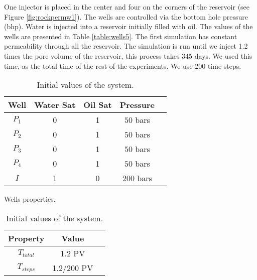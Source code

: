 \documentclass[12pt]{article}
\begin{document}
One injector is placed in the center and four on the corners of the reservoir (see Figure \ref{fig:rockpermw1}). The wells are controlled via the bottom hole pressure (bhp). 
 Water is injected into a reservoir initially filled with oil. The values of the wells are presented in Table \ref{table:wells5}. The first simulation has constant permeability through all the reservoir. The simulation is run until we inject 1.2 times the pore volume of the reservoir, this process takes 345 days. We used this time, as the total time of the rest of the experiments. We use 200 time steps.    
\begin{table}[!ht]
\hspace{-0cm}
\begin{minipage}{.5\textwidth}
\centering
\begin{tabular}{ |c|c|c|c|c|} 
\hline
Well&Water Sat&Oil Sat&Pressure\\
\hline
$P_1$&     0&    1 & $50$ bars \\  
$P_2$& 0& 1& $50$ bars\\
$P_3$&     0&    1 & $50$ bars \\  
$P_4$& 0& 1& $50$ bars\\
$I$&     1&    0 & $200$ bars\\  
\hline
\end{tabular}
\caption{Wells properties.}\label{table:wells5}
\end{minipage}%
\begin{minipage}{.4\textwidth}
\centering
\begin{tabular}{ |c|c|c|} 
\hline
Property&Value\\
\hline
    $T_{total}$&     1.2 PV\\
$T_{steps}$& 1.2/200 PV\\
\hline
\end{tabular}\caption{Initial values of the system.}
\label{table:icw}
\end{minipage}
\hspace{1cm} 
\end{table} 
\end{document}
